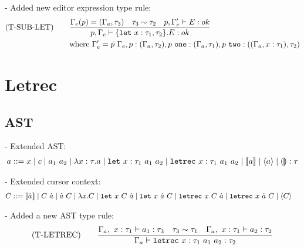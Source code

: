 \documentclass[10pt,a4paper,english]{article}
\newcommand\letin[3]{\texttt{let}~#1~#2~#3}
\newcommand\letrec[3]{\texttt{letrec}~#1~#2~#3}
\begin{document}
- Added new editor expression type rule:
\begin{align}
  (\text{T-SUB-LET})\qquad
&\frac{\Gamma_{e}(p) = (\Gamma_{a},\tau_3) \quad \tau_3\sim\tau_2 \quad p,\Gamma_{e}' \vdash E : ok}{p,\Gamma_{e} \vdash \{\texttt{let}~x : \tau_1,\tau_2\}.E : ok}\\
&\text{where}~\Gamma_{e}' = \bar{p}~\Gamma_{e}, p : (\Gamma_{a}, \tau_2), p~\texttt{one} : (\Gamma_{a}, \tau_1), p~\texttt{two} : ((\Gamma_{a},x : \tau_1),\tau_2)
\end{align}

\newpage

\section{Letrec}
\subsection{AST}
- Extended AST:
\begin{align}
  a ::= x
  \mid c
  \mid \app{a_1}{a_2}
  \mid \abs{\bind{x}{\tau}}{a}
  \mid \letin{\bind{x}{\tau_1}}{a_1}{a_2}
  \mid \letrec{\bind{x}{\tau_1}}{a_1}{a_2}
  \mid \cursor{a}
  \mid \breakpoint{a}
  \mid \bind{\hole}{\tau}
\end{align}

- Extended cursor context:
\begin{align}
  C &::= \cursor{\hat{a}}
\mid \app{C}{\hat{a}}
\mid \app{\hat{a}}{C}
\mid \abs{x}{C}
\mid \letin{x}{C}{\hat{a}}
\mid \letin{x}{\hat{a}}{C}
\mid \letrec{x}{C}{\hat{a}}
\mid \letrec{x}{\hat{a}}{C}
\mid \breakpoint{C}
\end{align}

- Added a new AST type rule:
\begin{align}
  (\text{T-LETREC})\qquad
  \frac{\ctx{a},~\bind{x}{\tau_1} \vdash \bind{a_1}{\tau_3} \quad \tau_3\sim\tau_1 \quad \ctx{a},~\bind{x}{\tau_1} \vdash \bind{a_2}{\tau_2}}
{\ctx{a} \vdash \bind{\letrec{\bind{x}{\tau_1}}{a_1}{a_2}}{\tau_2}}
\end{align}
\end{document}
